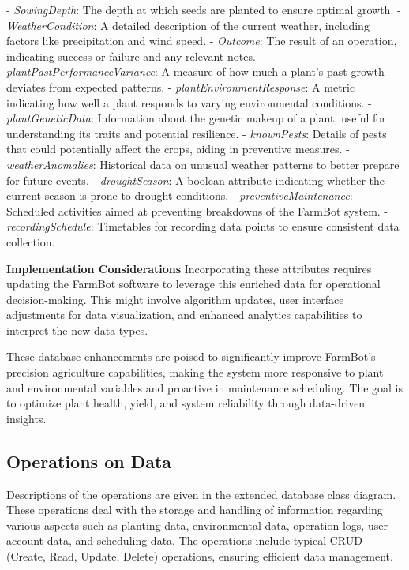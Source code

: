 - \textit{SowingDepth}: The depth at which seeds are planted to ensure optimal growth.
- \textit{WeatherCondition}: A detailed description of the current weather, including factors like precipitation and wind speed.
- \textit{Outcome}: The result of an operation, indicating success or failure and any relevant notes.
- \textit{plantPastPerformanceVariance}: A measure of how much a plant's past growth deviates from expected patterns.
- \textit{plantEnvironmentResponse}: A metric indicating how well a plant responds to varying environmental conditions.
- \textit{plantGeneticData}: Information about the genetic makeup of a plant, useful for understanding its traits and potential resilience.
- \textit{knownPests}: Details of pests that could potentially affect the crops, aiding in preventive measures.
- \textit{weatherAnomalies}: Historical data on unusual weather patterns to better prepare for future events.
- \textit{droughtSeason}: A boolean attribute indicating whether the current season is prone to drought conditions.
- \textit{preventiveMaintenance}: Scheduled activities aimed at preventing breakdowns of the FarmBot system.
- \textit{recordingSchedule}: Timetables for recording data points to ensure consistent data collection.

\textbf{Implementation Considerations
}
Incorporating these attributes requires updating the FarmBot software to leverage this enriched data for operational decision-making. This might involve algorithm updates, user interface adjustments for data visualization, and enhanced analytics capabilities to interpret the new data types.

These database enhancements are poised to significantly improve FarmBot's precision agriculture capabilities, making the system more responsive to plant and environmental variables and proactive in maintenance scheduling. The goal is to optimize plant health, yield, and system reliability through data-driven insights.


\subsection{Operations on Data}

Descriptions of the operations are given in the extended database class diagram. These operations deal with the storage and handling of information regarding various aspects such as planting data, environmental data, operation logs, user account data, and scheduling data. The operations include typical CRUD (Create, Read, Update, Delete) operations, ensuring efficient data management.

